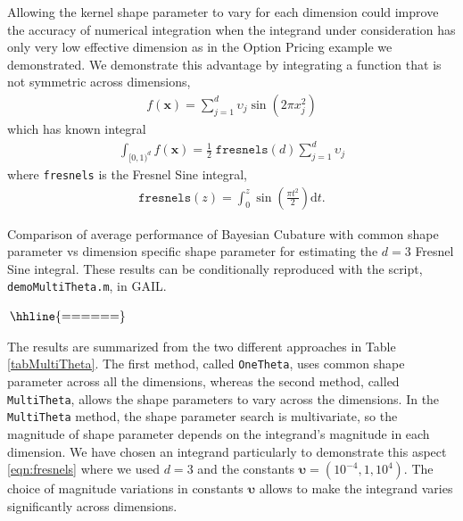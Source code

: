 \documentclass{svjour3}                     %
\newcommand{\bm}[1]{\boldsymbol{#1}}
\newcommand{\dif}[1]{\text{d}{#1}}
\newcommand{\vx}{\bm{x}}
\newcommand{\dt}{\dif{{t}}}
\newcommand{\code}[1]{\texttt{#1}}
\begin{document}
{{{{{{Allowing the kernel shape parameter to vary for each dimension could improve the accuracy of numerical integration when the integrand under consideration has only very low effective dimension  as in the Option Pricing example we demonstrated. We demonstrate this advantage by integrating a function that is not symmetric across dimensions,
\begin{align}
\label{eqn:fresnels}
f(\vx) = \sum_{j=1}^d \upsilon_j \sin(2 \pi x_j^2)
\end{align} 
which has known integral
\begin{align*}
\int_{[0,1)^d} f(\vx)  = \frac{1}{2} \; \code{fresnels}(d) \sum_{j=1}^{d} \upsilon_j
\end{align*}
where \code{fresnels} is the Fresnel Sine integral,
\begin{align*}
\code{fresnels}(z) = \int_{0}^{z} \sin \left( \frac{\pi t^2}{2} \right) \dt.
\end{align*}


\begin{table}[ht] %
\centering
\caption{Comparison of average performance of Bayesian Cubature with common shape parameter vs dimension specific shape parameter
for estimating the $d=3$ Fresnel Sine integral. These results can be conditionally reproduced with the script, \code{demoMultiTheta.m}, in GAIL. 
\label{tabMultiTheta}}	   
$
\arraycolsep=1.4pt\def\arraystretch{0.9}
\begin{array}{l@{\quad}r@{\quad}r@{\quad}r@{\quad}r@{\quad}r@{\quad}r}
\hhline{======}
 
\end{array}	
$
\end{table}

The results are summarized from the two different approaches in Table \ref{tabMultiTheta}. The first method, called \code{OneTheta}, uses common shape parameter across all the dimensions, whereas the second method, called \code{MultiTheta}, allows the shape parameters to vary across the dimensions. In the \code{MultiTheta} method, the shape parameter search is multivariate, so the magnitude of shape parameter depends on the integrand's magnitude in each dimension. We have chosen an integrand particularly to demonstrate this aspect \eqref{eqn:fresnels} where we used $d=3$ and the constants $\bm{\upsilon}= (10^{-4}, 1, 10^4)$. The choice of magnitude variations in constants $\bm{\upsilon}$ allows to make the integrand varies significantly across dimensions.

}}}}}}
\end{document}

